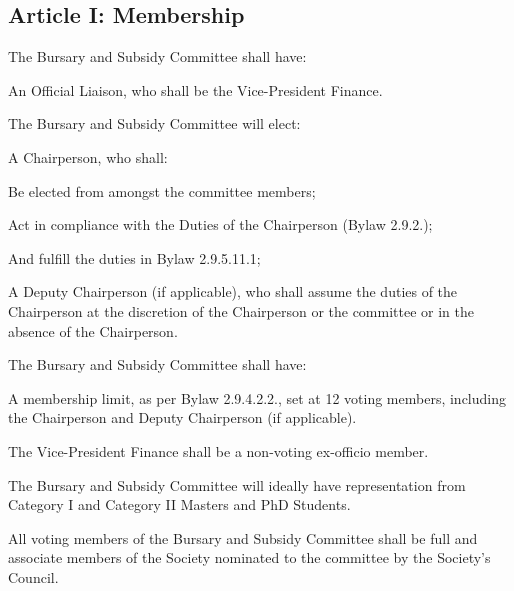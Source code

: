 \subsection{Article I: Membership}
\begin{longenum}[ label*=\thesubsection.\arabic*., align=left] 
	\item The Bursary and Subsidy Committee shall have:
		\begin{longenum}[ label*=\arabic*., align=left] 
		\item An Official Liaison, who shall be the Vice-President Finance.
		\end{longenum}
	\item The Bursary and Subsidy Committee will elect:
		\begin{longenum}[ label*=\arabic*., align=left]
		\item A Chairperson, who shall:
			\begin{longenum}[ label*=\arabic*., align=left]
			\item Be elected from amongst the committee members;
			\item Act in compliance with the Duties of the Chairperson (Bylaw 2.9.2.);
			\item And fulfill the duties in Bylaw 2.9.5.11.1;
			\item A Deputy Chairperson (if applicable), who shall assume the duties of the Chairperson at the discretion of the Chairperson or the committee or in the absence of the Chairperson.
			\end{longenum}
		\end{longenum}
	\item The Bursary and Subsidy Committee shall have:
		\begin{longenum}[ label*=\arabic*., align=left]
		\item A membership limit, as per Bylaw 2.9.4.2.2., set at 12 voting members, including the Chairperson and Deputy Chairperson (if applicable).
		\end{longenum}
	\item The Vice-President Finance shall be a non-voting ex-officio member.
	\item The Bursary and Subsidy Committee will ideally have representation from Category I and Category II Masters and PhD Students.
	\item All voting members of the Bursary and Subsidy Committee shall be full and associate members of the Society nominated to the committee by the Society’s Council.     
\end{longenum}


